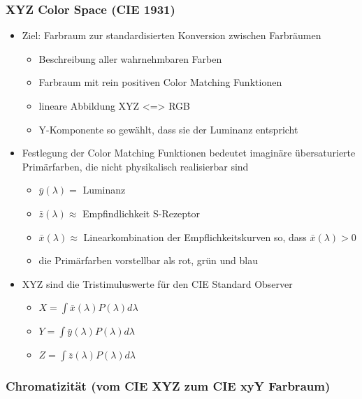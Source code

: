 \documentclass[paper=a4, fontsize=11pt]{scrartcl} %
\numberwithin{equation}{section} %
\numberwithin{figure}{section} %
\numberwithin{table}{section} %
\begin{document}
\subsubsection{XYZ Color Space (CIE 1931)}

\begin{itemize}
\item Ziel: Farbraum zur standardisierten Konversion zwischen Farbräumen
\begin{itemize}
\item Beschreibung aller wahrnehmbaren Farben
\item Farbraum mit rein positiven Color Matching Funktionen
\item lineare Abbildung XYZ <=> RGB
\item Y-Komponente so gewählt, dass sie der Luminanz entspricht
\end{itemize}
\item Festlegung der Color Matching Funktionen bedeutet imaginäre übersaturierte Primärfarben, die nicht physikalisch realisierbar sind
\begin{itemize}
\item $\bar{y}(\lambda) =$ Luminanz
\item $\bar{z}(\lambda) \approx$ Empfindlichkeit S-Rezeptor
\item $\bar{x}(\lambda) \approx$ Linearkombination der Empflichkeitskurven so, dass $\bar{x}(\lambda) > 0$
\item die Primärfarben vorstellbar als rot, grün und blau
\end{itemize}
\item XYZ sind die Tristimuluswerte für den \glqq CIE Standard Observer\grqq
\begin{itemize}
\item $X = \int \bar{x}(\lambda)P(\lambda)d\lambda$
\item $Y = \int \bar{y}(\lambda)P(\lambda)d\lambda$
\item $Z = \int \bar{z}(\lambda)P(\lambda)d\lambda$
\end{itemize}
\end{itemize}

\subsubsection{Chromatizität (vom CIE XYZ zum CIE xyY Farbraum)}
\end{document}
